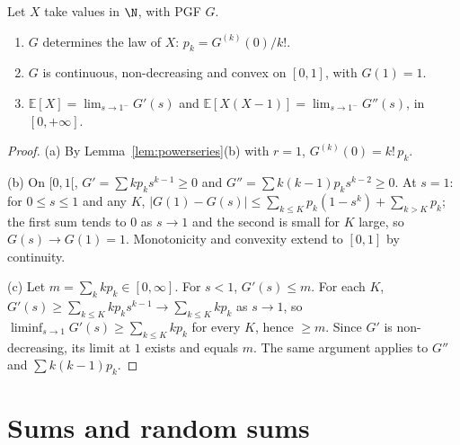 \begin{proposition}\label{prop:pgf}
Let $X$ take values in $\N$, with PGF $G$.
\begin{enumerate}[label=(\alph*)]
\item $G$ determines the law of $X$: $p_k=G^{(k)}(0)/k!$.
\item $G$ is continuous, non-decreasing and convex on $[0,1]$, with $G(1)=1$.
\item $\mathbb E[X]=\lim_{s\to1^-}G'(s)$ and $\mathbb E[X(X-1)]=\lim_{s\to1^-}G''(s)$, in $[0,+\infty]$.
\end{enumerate}
\end{proposition}
\begin{proof}
(a) By Lemma~\ref{lem:powerseries}(b) with $r=1$, $G^{(k)}(0)=k!\,p_k$.

(b) On $[0,1[$, $G'=\sum kp_ks^{k-1}\ge0$ and $G''=\sum k(k-1)p_ks^{k-2}\ge0$. At $s=1$: for $0\le s\le1$ and any $K$,
$|G(1)-G(s)|\le\sum_{k\le K}p_k(1-s^k)+\sum_{k>K}p_k$; the first sum tends to $0$ as $s\to1$ and the second is small for
$K$ large, so $G(s)\to G(1)=1$. Monotonicity and convexity extend to $[0,1]$ by continuity.

(c) Let $m=\sum_kkp_k\in[0,\infty]$. For $s<1$, $G'(s)\le m$. For each $K$, $G'(s)\ge\sum_{k\le K}kp_ks^{k-1}\to\sum_{k\le K}kp_k$ as $s\to1$,
so $\liminf_{s\to1}G'(s)\ge\sum_{k\le K}kp_k$ for every $K$, hence $\ge m$. Since $G'$ is non-decreasing, its limit at $1$ exists and
equals $m$. The same argument applies to $G''$ and $\sum k(k-1)p_k$.
\end{proof}

\section{Sums and random sums}

